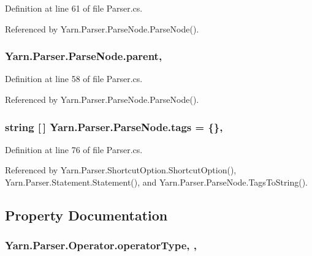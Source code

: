 Definition at line 61 of file Parser.\-cs.



Referenced by Yarn.\-Parser.\-Parse\-Node.\-Parse\-Node().

\hypertarget{a00142_af313a82103fcc2ff5a177dbb06b92f7b}{
\subsubsection[{parent}]{ Yarn.\-Parser.\-Parse\-Node.\-parent\hspace{0.3cm}{\ttfamily [package]}, {\ttfamily [inherited]}}}\label{a00142_af313a82103fcc2ff5a177dbb06b92f7b}


Definition at line 58 of file Parser.\-cs.



Referenced by Yarn.\-Parser.\-Parse\-Node.\-Parse\-Node().

\hypertarget{a00142_a58b3a15788fd2d4127d73619dc6d04ae}{
\subsubsection[{tags}]{\setlength{\rightskip}{0pt plus 5cm}string \mbox{[}$\,$\mbox{]} Yarn.\-Parser.\-Parse\-Node.\-tags = \{\}\hspace{0.3cm}{\ttfamily [package]}, {\ttfamily [inherited]}}}\label{a00142_a58b3a15788fd2d4127d73619dc6d04ae}


Definition at line 76 of file Parser.\-cs.



Referenced by Yarn.\-Parser.\-Shortcut\-Option.\-Shortcut\-Option(), Yarn.\-Parser.\-Statement.\-Statement(), and Yarn.\-Parser.\-Parse\-Node.\-Tags\-To\-String().



\subsection{Property Documentation}
\hypertarget{a00137_ac2de2f59be0e69b316627a4de16fadd3}{
\subsubsection[{operator\-Type}]{ Yarn.\-Parser.\-Operator.\-operator\-Type\hspace{0.3cm}{\ttfamily [get]}, {\ttfamily [set]}, {\ttfamily [package]}}}\label{a00137_ac2de2f59be0e69b316627a4de16fadd3}


